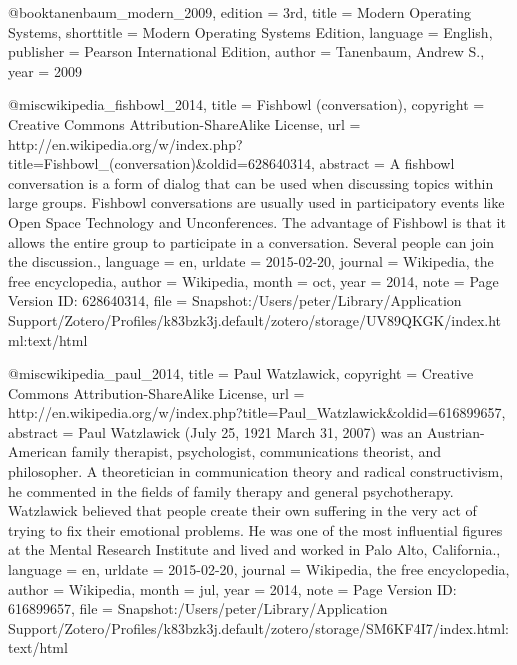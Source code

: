 {@book{tanenbaum_modern_2009,
  edition    = {3rd},
  title      = {Modern {Operating} {Systems}},
  shorttitle = {Modern {Operating} {Systems} {Edition}},
  language   = {English},
  publisher  = {Pearson International Edition},
  author     = {Tanenbaum, Andrew S.},
  year       = {2009}
}

@misc{wikipedia_fishbowl_2014,
  title     = {Fishbowl (conversation)},
  copyright = {Creative Commons Attribution-ShareAlike License},
  url       = {http://en.wikipedia.org/w/index.php?title=Fishbowl_(conversation)&oldid=628640314},
  abstract  = {A fishbowl conversation is a form of dialog that can be used when discussing topics within large groups. Fishbowl conversations are usually used in participatory events like Open Space Technology and Unconferences. The advantage of Fishbowl is that it allows the entire group to participate in a conversation. Several people can join the discussion.},
  language  = {en},
  urldate   = {2015-02-20},
  journal   = {Wikipedia, the free encyclopedia},
  author    = {{Wikipedia}},
  month     = oct,
  year      = {2014},
  note      = {Page Version ID: 628640314},
  file      = {Snapshot:/Users/peter/Library/Application Support/Zotero/Profiles/k83bzk3j.default/zotero/storage/UV89QKGK/index.html:text/html}
}

@misc{wikipedia_paul_2014,
  title     = {Paul {Watzlawick}},
  copyright = {Creative Commons Attribution-ShareAlike License},
  url       = {http://en.wikipedia.org/w/index.php?title=Paul_Watzlawick&oldid=616899657},
  abstract  = {Paul Watzlawick (July 25, 1921 {\textendash} March 31, 2007) was an Austrian-American family therapist, psychologist, communications theorist, and philosopher. A theoretician in communication theory and radical constructivism, he commented in the fields of family therapy and general psychotherapy. Watzlawick believed that people create their own suffering in the very act of trying to fix their emotional problems. He was one of the most influential figures at the Mental Research Institute and lived and worked in Palo Alto, California.},
  language  = {en},
  urldate   = {2015-02-20},
  journal   = {Wikipedia, the free encyclopedia},
  author    = {{Wikipedia}},
  month     = jul,
  year      = {2014},
  note      = {Page Version ID: 616899657},
  file      = {Snapshot:/Users/peter/Library/Application Support/Zotero/Profiles/k83bzk3j.default/zotero/storage/SM6KF4I7/index.html:text/html}
}

}
